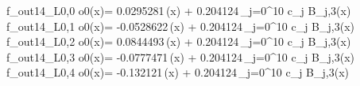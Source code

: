 f_{out14_L0,0	o0}(x)= 0.0295281\,\phi(x) + 0.204124\,\sum_{j=0}^{10} c_j B_{j,3}(x)
f_{out14_L0,1	o0}(x)= -0.0528622\,\phi(x) + 0.204124\,\sum_{j=0}^{10} c_j B_{j,3}(x)
f_{out14_L0,2	o0}(x)= 0.0844493\,\phi(x) + 0.204124\,\sum_{j=0}^{10} c_j B_{j,3}(x)
f_{out14_L0,3	o0}(x)= -0.0777471\,\phi(x) + 0.204124\,\sum_{j=0}^{10} c_j B_{j,3}(x)
f_{out14_L0,4	o0}(x)= -0.132121\,\phi(x) + 0.204124\,\sum_{j=0}^{10} c_j B_{j,3}(x)
